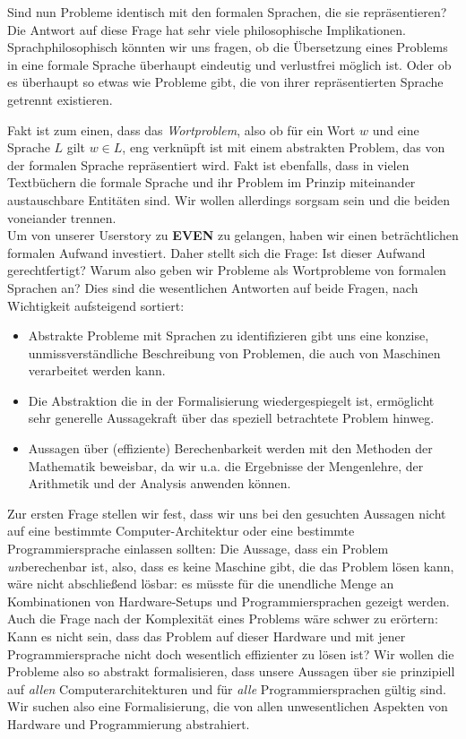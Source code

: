 Sind nun Probleme identisch mit den formalen Sprachen, die sie repräsentieren? 
Die Antwort auf diese Frage hat sehr viele philosophische Implikationen.
Sprachphilosophisch könnten wir uns fragen,
ob die Übersetzung eines Problems in eine formale Sprache
überhaupt eindeutig und verlustfrei möglich ist.
Oder ob es überhaupt so etwas wie Probleme gibt, die von ihrer repräsentierten Sprache 
getrennt existieren.

Fakt ist zum einen, dass das \emph{Wortproblem}, also ob für ein Wort $w$ und eine Sprache $L$
gilt $w \in L$,
eng verknüpft ist mit einem abstrakten Problem, das von der formalen Sprache repräsentiert wird. 
Fakt ist ebenfalls, dass in vielen Textbüchern die formale Sprache und ihr Problem
im Prinzip miteinander austauschbare Entitäten sind. 
Wir wollen allerdings sorgsam sein und die beiden voneiander trennen.\\

\noindent
Um von unserer Userstory zu \textbf{EVEN} zu gelangen,
haben wir einen beträchtlichen formalen Aufwand investiert.
Daher stellt sich die Frage: Ist dieser Aufwand gerechtfertigt? 
Warum also geben wir Probleme als Wortprobleme von formalen Sprachen an?
Dies sind die wesentlichen Antworten auf beide Fragen,
nach Wichtigkeit aufsteigend sortiert:
\begin{itemize}
    \item Abstrakte Probleme mit Sprachen zu identifizieren gibt uns eine
        konzise, unmissverständliche Beschreibung von Problemen,
        die auch von Maschinen verarbeitet werden kann. 
    \item Die Abstraktion die in der Formalisierung wiedergespiegelt ist,
        ermöglicht sehr generelle Aussagekraft über das speziell betrachtete Problem hinweg.
    \item Aussagen über (effiziente) Berechenbarkeit werden mit den Methoden der Mathematik
        beweisbar, da wir u.a. die Ergebnisse der Mengenlehre, der Arithmetik
        und der Analysis anwenden können.
\end{itemize}


Zur ersten Frage stellen wir fest,
dass wir uns bei den gesuchten Aussagen nicht auf eine bestimmte Computer-Architektur
oder eine bestimmte Programmiersprache einlassen sollten:
Die Aussage, dass ein Problem \emph{un}berechenbar ist,
also, dass es keine Maschine gibt, die das Problem lösen kann,
wäre nicht abschließend lösbar:
es müsste für die unendliche Menge an Kombinationen von Hardware-Setups und Programmiersprachen
gezeigt werden.
Auch die Frage nach der Komplexität eines Problems wäre schwer zu erörtern:
Kann es nicht sein, dass das Problem auf dieser Hardware
und mit jener Programmiersprache nicht doch wesentlich effizienter zu lösen ist?
Wir wollen die Probleme also so abstrakt formalisieren,
dass unsere Aussagen über sie prinzipiell auf \emph{allen} Computerarchitekturen
und für \emph{alle} Programmiersprachen gültig sind.
Wir suchen also eine Formalisierung,
die von allen unwesentlichen Aspekten von Hardware und Programmierung abstrahiert.


